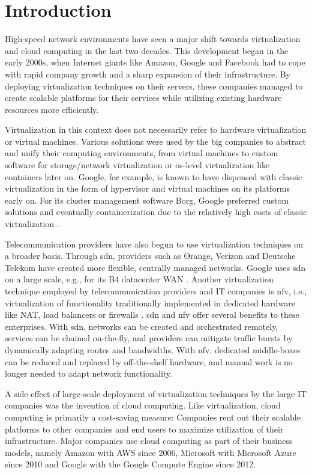\chapter{Introduction}
\label{chap:introduction}

High-speed network environments have seen a major shift towards virtualization
and cloud computing in the last two decades. This development began in the early
2000s, when Internet giants like Amazon, Google and Facebook had to cope with
rapid company growth and a sharp expansion of their infrastructure. By deploying
virtualization techniques on their servers, these companies managed to create
scalable platforms for their services while utilizing existing hardware
resources more efficiently.

Virtualization in this context does not necessarily refer to hardware
virtualization or virtual machines. Various solutions were used by the big
companies to abstract and unify their computing environments, from virtual
machines to custom software for storage/network virtualization or \ac{os}-level
virtualization like containers later on. Google, for example, is known to have
dispensed with classic virtualization in the form of hypervisor and virtual
machines on its platforms early on. For its cluster management software Borg,
Google preferred custom solutions and eventually containerization due to the
relatively high costs of classic virtualization \cite{verma2015large}.

Telecommunication providers have also begun to use virtualization techniques on
a broader basis. Through \ac{sdn}, providers such as Orange, Verizon and
Deutsche Telekom \cite{csikor2020transition} have created more flexible,
centrally managed networks. Google uses \ac{sdn} on a large scale, e.g., for its
B4 datacenter WAN \cite{jain2013b4}. Another virtualization technique employed
by telecommunication providers and IT companies is \ac{nfv}, i.e.,
virtualization of functionality traditionally implemented in dedicated hardware
like NAT, load balancers or firewalls \cite{roy2018state}. \ac{sdn} and \ac{nfv}
offer several benefits to these enterprises. With \ac{sdn}, networks can be
created and orchestrated remotely, services can be chained on-the-fly, and
providers can mitigate traffic bursts by dynamically adapting routes and
bandwidths. With \ac{nfv}, dedicated middle-boxes can be reduced and replaced by
off-the-shelf hardware, and manual work is no longer needed to adapt network
functionality.

A side effect of large-scale deployment of virtualization techniques by the
large IT companies was the invention of cloud computing. Like virtualization,
cloud computing is primarily a cost-saving measure: Companies rent out their
scalable platforms to other companies and end users to maximize utilization of
their infrastructure. Major companies use cloud computing as part of their
business models, namely Amazon with AWS since 2006, Microsoft with Microsoft
Azure since 2010 and Google with the Google Compute Engine since 2012.

